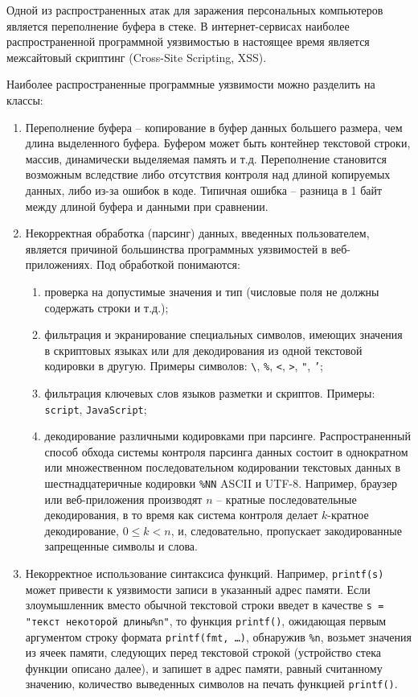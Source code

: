 \documentclass[10pt,a4paper]{book}
\begin{document}
Одной из распространенных атак для заражения персональных компьютеров является переполнение буфера в стеке. В интернет-сервисах наиболее распространенной программной уязвимостью в настоящее время является межсайтовый скриптинг (Cross-Site Scripting, XSS).

Наиболее распространенные программные уязвимости можно разделить на классы:
\begin{enumerate}
    \item Переполнение буфера -- копирование в буфер данных большего размера, чем длина выделенного буфера. Буфером может быть контейнер текстовой строки, массив, динамически выделяемая память и т.д. Переполнение становится возможным вследствие либо отсутствия контроля над длиной копируемых данных, либо из-за ошибок в коде. Типичная ошибка -- разница в 1 байт между длиной буфера и данными при сравнении.
    \item Некорректная обработка (парсинг) данных, введенных пользователем, является причиной большинства программных уязвимостей в веб-приложениях. Под обработкой понимаются:
        \begin{enumerate}
            \item проверка на допустимые значения и тип (числовые поля не должны содержать строки и т.д.);
            \item фильтрация и экранирование специальных символов, имеющих значения в скриптовых языках или для декодирования из одной текстовой кодировки в другую. Примеры символов: \texttt{\textbackslash},  \texttt{\%}, \texttt{<}, \texttt{>}, \texttt{"},  \texttt{'};
            \item фильтрация ключевых слов языков разметки и скриптов. Примеры: \texttt{script}, \texttt{JavaScript};
            \item декодирование различными кодировками при парсинге. Распространенный способ обхода системы контроля парсинга данных состоит в однократном или множественном последовательном кодировании текстовых данных в шестнадцатеричные кодировки \texttt{\%NN} ASCII и UTF-8. Например, браузер или веб-приложения производят $n$ -- кратные последовательные декодирования, в то время как система контроля делает $k$-кратное декодирование, $0 \leq k < n$, и, следовательно, пропускает закодированные запрещенные символы и слова.
        \end{enumerate}
    \item Некорректное использование синтаксиса функций. Например, \texttt{printf(s)} может привести к уязвимости записи в указанный адрес памяти. Если злоумышленник вместо обычной текстовой строки введет в качестве \texttt{s = "текст некоторой длины\%n"}, то функция \texttt{printf()}, ожидающая первым аргументом строку формата \texttt{printf(fmt, \dots)}, обнаружив \texttt{\%n}, возьмет значения из ячеек памяти, следующих перед текстовой строкой (устройство стека функции описано далее), и запишет в адрес памяти, равный считанному значению, количество выведенных символов на печать функцией \texttt{printf()}.
\end{enumerate}
\end{document}
